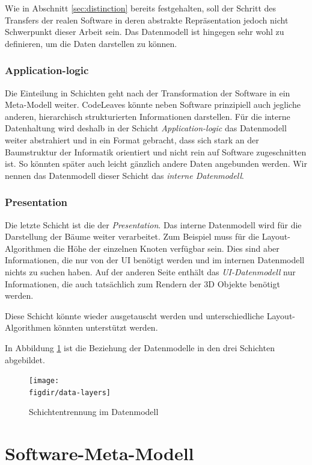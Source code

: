 Wie in Abschnitt \ref{sec:distinction} bereits festgehalten, soll der Schritt des Transfers der realen Software in deren abstrakte Repräsentation jedoch nicht Schwerpunkt dieser Arbeit sein. Das Datenmodell ist hingegen sehr wohl zu definieren, um die Daten darstellen zu können.

\subsubsection*{Application-logic}
Die Einteilung in Schichten geht nach der Transformation der Software in ein Meta-Modell weiter. CodeLeaves könnte neben Software prinzipiell auch jegliche anderen, hierarchisch strukturierten Informationen darstellen. Für die interne Datenhaltung wird deshalb in der Schicht \textit{Application-logic} das Datenmodell weiter abstrahiert und in ein Format gebracht, dass sich stark an der Baumstruktur der Informatik orientiert und nicht rein auf Software zugeschnitten ist. So könnten später auch leicht gänzlich andere Daten angebunden werden. Wir nennen das Datenmodell dieser Schicht das \textit{interne Datenmodell}.

\subsubsection*{Presentation}
Die letzte Schicht ist die der \textit{Presentation}. Das interne Datenmodell wird für die Darstellung der Bäume weiter verarbeitet. Zum Beispiel muss für die Layout-Algorithmen die Höhe der einzelnen Knoten verfügbar sein. Dies sind aber Informationen, die nur von der UI benötigt werden und im internen Datenmodell nichts zu suchen haben. Auf der anderen Seite enthält das \textit{UI-Datenmodell} nur Informationen, die auch tatsächlich zum Rendern der 3D Objekte benötigt werden.

Diese Schicht könnte wieder ausgetauscht werden und unterschiedliche Layout-Algorithmen könnten unterstützt werden.

In Abbildung \ref{fig:data-layers} ist die Beziehung der Datenmodelle in den drei Schichten abgebildet.

\begin{figure}[htb]
  \texttt{[image: \\figdir/data-layers]}
  \caption{Schichtentrennung im Datenmodell}
  \label{fig:data-layers}
\end{figure}

\section{Software-Meta-Modell}
\label{sec:software-model}

